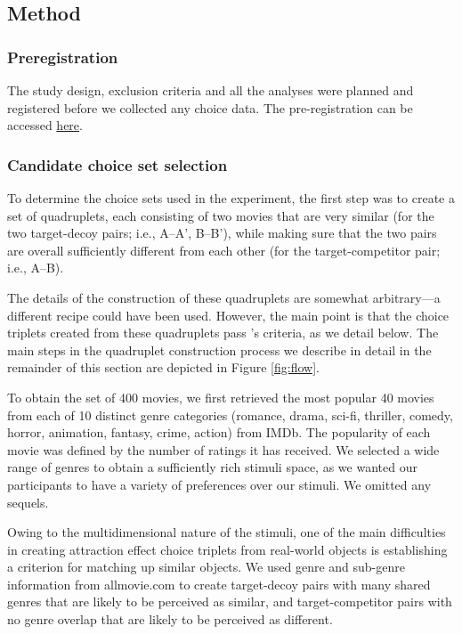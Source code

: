 \documentclass[12pt, a4paper]{article}
\begin{document}
\subsection*{Method}

\subsubsection*{Preregistration}
The study design, exclusion criteria and all the analyses were planned and registered before we collected any choice data. The pre-registration can be accessed \href{https://osf.io/fme6c/?view_only=31da4193689f4247a76af93b2f98fcef}{here}.

\subsubsection*{Candidate choice set selection}

To determine the choice sets used in the experiment, the first step was to create a set of quadruplets, each consisting of two movies that are very similar (for the two target-decoy pairs; i.e., A--A', B--B'), while making sure that the two pairs are overall sufficiently different from each other (for the target-competitor pair; i.e., A--B).

The details of the construction of these quadruplets are somewhat arbitrary---a different recipe could have been used. However, the main point is that the choice triplets created from these quadruplets pass \citeauthor{Huber2014}'s \citeyear{Huber2014} criteria, as we detail below. The main steps in the quadruplet construction process we describe in detail in the remainder of this section are depicted in Figure \ref{fig:flow}.


To obtain the set of 400 movies, we first retrieved the most popular 40 movies from each of 10 distinct genre categories (romance, drama, sci-fi, thriller, comedy, horror, animation, fantasy, crime, action) from IMDb. The popularity of each movie was defined by the number of ratings it has received. We selected a wide range of genres to obtain a sufficiently rich stimuli space, as we wanted our participants to have a variety of preferences over our stimuli. We omitted any sequels.

Owing to the multidimensional nature of the stimuli, one of the main difficulties in creating attraction effect choice triplets from real-world objects is establishing a criterion for matching up similar objects. We used genre and sub-genre information from allmovie.com to create target-decoy pairs with many shared genres that are likely to be perceived as similar, and target-competitor pairs with no genre overlap that are likely to be perceived as different.
\end{document}
